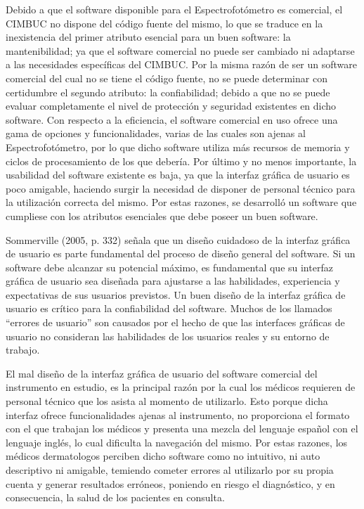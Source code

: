 \documentclass[12pt, a4paper]{article}
\begin{document}
Debido a que el software disponible para el Espectrofot\'{o}metro es comercial, el CIMBUC no dispone del c\'{o}digo fuente del mismo, lo que se traduce en la inexistencia del primer atributo esencial para un buen software: la mantenibilidad; ya que el software comercial no puede ser cambiado ni adaptarse a las necesidades espec\'{i}ficas del CIMBUC. Por la misma raz\'{o}n de ser un software comercial del cual no se tiene el c\'{o}digo fuente, no se puede determinar con certidumbre el segundo atributo: la confiabilidad; debido a que no se puede evaluar completamente el nivel de protecci\'{o}n y seguridad existentes en dicho software. Con respecto a la eficiencia, el software comercial en uso ofrece una gama de opciones y funcionalidades, varias de las cuales son ajenas al Espectrofot\'{o}metro, por lo que dicho software utiliza m\'{a}s recursos de memoria y ciclos de procesamiento de los que deber\'{i}a. Por \'{u}ltimo y no menos importante, la usabilidad del software existente es baja, ya que la interfaz gr\'{a}fica de usuario es poco amigable, haciendo surgir la necesidad de disponer de personal t\'{e}cnico para la utilizaci\'{o}n correcta del mismo. Por estas razones, se desarroll\'{o} un software que cumpliese con los atributos esenciales que debe poseer un buen software.

Sommerville (2005, p. 332) se\~{n}ala que un dise\~{n}o cuidadoso de la interfaz gr\'{a}fica de usuario es parte fundamental del proceso de dise\~{n}o general del software. Si un software debe alcanzar su potencial m\'{a}ximo, es fundamental que su interfaz gr\'{a}fica de usuario sea dise\~{n}ada para ajustarse a las habilidades, experiencia y expectativas de sus usuarios previstos. Un buen dise\~{n}o de la interfaz gr\'{a}fica de usuario es cr\'{i}tico para la confiabilidad del software. Muchos de los llamados ``errores de usuario'' son causados por el hecho de que las interfaces gr\'{a}ficas de usuario no consideran las habilidades de los usuarios reales y su entorno de trabajo.

El mal dise\~{n}o de la interfaz gr\'{a}fica de usuario del software comercial del instrumento en estudio, es la principal raz\'{o}n por la cual los m\'{e}dicos requieren de personal t\'{e}cnico que los asista al momento de utilizarlo. Esto porque dicha interfaz ofrece funcionalidades ajenas al instrumento, no proporciona el formato con el que trabajan los m\'{e}dicos y presenta una mezcla del lenguaje espa\~{n}ol con el lenguaje ingl\'{e}s, lo cual dificulta la navegaci\'{o}n del mismo. Por estas razones, los m\'{e}dicos dermatologos perciben dicho software como no intuitivo, ni auto descriptivo ni amigable, temiendo cometer errores al utilizarlo por su propia cuenta y generar resultados err\'{o}neos, poniendo en riesgo el diagn\'{o}stico, y en consecuencia, la salud de los pacientes en consulta.
\end{document}
